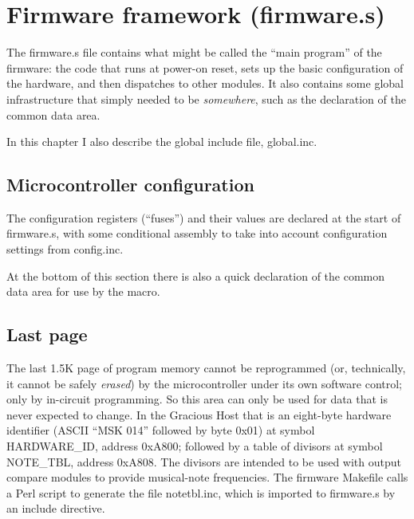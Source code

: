 
%
%
%
%
%
%

\chapter{Firmware framework (firmware.s)}

The firmware.s file contains what might be called the ``main program'' of
the firmware:  the code that runs at power-on reset, sets up the basic
configuration of the hardware, and then dispatches to
other modules.  It also contains some global infrastructure that simply
needed to be \emph{somewhere}, such as the declaration of the common data
area.

In this chapter I also describe the global include file, global.inc.

\section{Microcontroller configuration}

The configuration registers (``fuses'') and their values are declared at the
start of firmware.s, with some conditional assembly to take into account
configuration settings from config.inc.

At the bottom of this section there is also a quick declaration of the
common data area for use by the  macro.

\section{Last page}

The last 1.5K page of program memory cannot be reprogrammed (or,
technically, it cannot be safely \emph{erased}) by the microcontroller under
its own software control; only by in-circuit programming.  So this area can
only be used for data that is never expected to change.  In the Gracious
Host that is an eight-byte hardware identifier (ASCII ``MSK 014'' followed
by byte 0x01) at symbol HARDWARE\_ID, address 0xA800; followed by a table of
divisors at symbol NOTE\_TBL, address 0xA808.  The divisors are intended to
be used with output compare modules to provide musical-note frequencies. 
The firmware Makefile calls a Perl script to generate the file notetbl.inc,
which is imported to firmware.s by an include directive.

